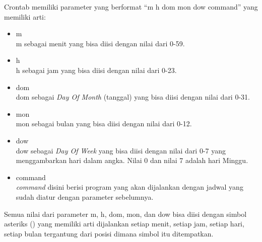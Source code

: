 Crontab memiliki parameter yang berformat ``m h dom mon dow command'' yang memiliki arti:
\begin{itemize}
	\item m\\
	m sebagai menit yang bisa diisi dengan nilai dari 0-59. 
	\item h\\
	h sebagai jam yang bisa diisi dengan nilai dari 0-23.
	\item dom\\
	dom sebagai \textit{Day Of Month} (tanggal) yang bisa diisi dengan nilai dari 0-31.
	\item mon\\
	mon sebagai bulan yang bisa diisi dengan nilai dari 0-12.
	\item dow\\
	dow sebagai \textit{Day Of Week} yang bisa diisi dengan nilai dari 0-7 yang menggambarkan hari dalam angka. Nilai 0 dan nilai 7 adalah hari Minggu. 
	\item command\\
	\textit{command} disini berisi program yang akan dijalankan dengan jadwal yang sudah diatur dengan parameter sebelumnya. 
\end{itemize}

Semua nilai dari parameter m, h, dom, mon, dan dow bisa diisi dengan simbol asteriks (\*) yang memiliki arti dijalankan setiap menit, setiap jam, setiap hari, setiap bulan tergantung dari posisi dimana simbol itu ditempatkan. 
\label{sec:cron}
 
